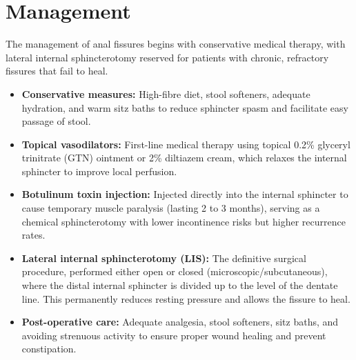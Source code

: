 \section*{Management}
The management of anal fissures begins with conservative medical therapy, with lateral internal sphincterotomy reserved for patients with chronic, refractory fissures that fail to heal.
\begin{itemize}
    \item \textbf{Conservative measures:} High-fibre diet, stool softeners, adequate hydration, and warm sitz baths to reduce sphincter spasm and facilitate easy passage of stool.
    \item \textbf{Topical vasodilators:} First-line medical therapy using topical 0.2\% glyceryl trinitrate (GTN) ointment or 2\% diltiazem cream, which relaxes the internal sphincter to improve local perfusion.
    \item \textbf{Botulinum toxin injection:} Injected directly into the internal sphincter to cause temporary muscle paralysis (lasting 2 to 3 months), serving as a chemical sphincterotomy with lower incontinence risks but higher recurrence rates.
    \item \textbf{Lateral internal sphincterotomy (LIS):} The definitive surgical procedure, performed either open or closed (microscopic/subcutaneous), where the distal internal sphincter is divided up to the level of the dentate line. This permanently reduces resting pressure and allows the fissure to heal.
    \item \textbf{Post-operative care:} Adequate analgesia, stool softeners, sitz baths, and avoiding strenuous activity to ensure proper wound healing and prevent constipation.
\end{itemize}

